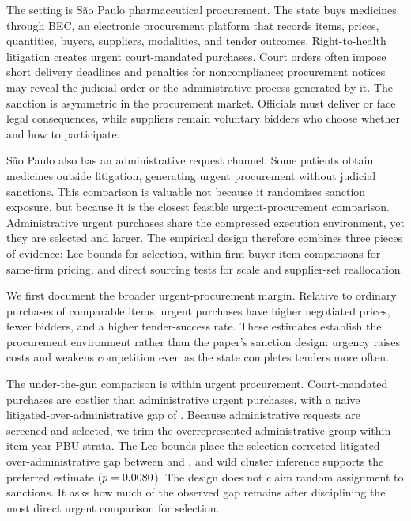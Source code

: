 The setting is S\~ao Paulo pharmaceutical procurement. The state buys medicines through BEC, an electronic procurement platform that records items, prices, quantities, buyers, suppliers, modalities, and tender outcomes. Right-to-health litigation creates urgent court-mandated purchases. Court orders often impose short delivery deadlines and penalties for noncompliance; procurement notices may reveal the judicial order or the administrative process generated by it. The sanction is asymmetric in the procurement market. Officials must deliver or face legal consequences, while suppliers remain voluntary bidders who choose whether and how to participate.

S\~ao Paulo also has an administrative request channel. Some patients obtain medicines outside litigation, generating urgent procurement without judicial sanctions. This comparison is valuable not because it randomizes sanction exposure, but because it is the closest feasible urgent-procurement comparison. Administrative urgent purchases share the compressed execution environment, yet they are selected and larger. The empirical design therefore combines three pieces of evidence: Lee bounds for selection, within firm-buyer-item comparisons for same-firm pricing, and direct sourcing tests for scale and supplier-set reallocation.

We first document the broader urgent-procurement margin. Relative to ordinary purchases of comparable items, urgent purchases have \BPnegPctHeadline{} higher negotiated prices, \BPfirmsPctHeadlineAbs{} fewer bidders, and a \BPsuccessPP{} higher tender-success rate. These estimates establish the procurement environment rather than the paper's sanction design: urgency raises costs and weakens competition even as the state completes tenders more often.

The under-the-gun comparison is within urgent procurement. Court-mandated purchases are costlier than administrative urgent purchases, with a naive litigated-over-administrative gap of \BPutgPointNaive{}. Because administrative requests are screened and selected, we trim the overrepresented administrative group within item-year-PBU strata. The Lee bounds place the selection-corrected litigated-over-administrative gap between \BPutgBoundLow{} and \BPutgBoundHigh{}, and wild cluster inference supports the preferred estimate ($p=0.0080{}$). The design does not claim random assignment to sanctions. It asks how much of the observed gap remains after disciplining the most direct urgent comparison for selection.

